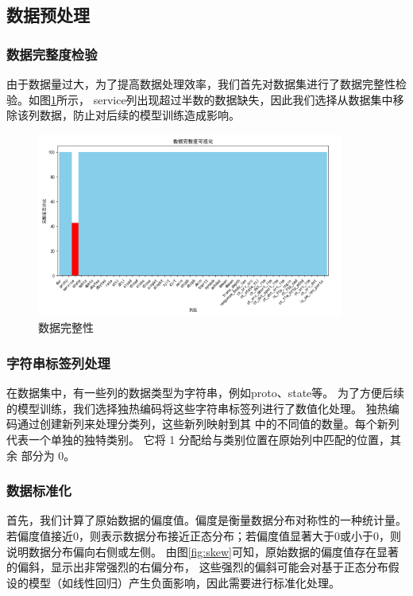 \documentclass{article}
\begin{document}
\subsection{数据预处理}

\subsubsection{数据完整度检验}
由于数据量过大，为了提高数据处理效率，我们首先对数据集进行了数据完整性检验。如图\ref{fig:full}所示，
service列出现超过半数的数据缺失，因此我们选择从数据集中移除该列数据，防止对后续的模型训练造成影响。\cite{ref6}
\begin{figure}[htpb]
  \centering
  \includegraphics[width=0.9\textwidth]{./png/full.png}
  \caption{数据完整性}
  \label{fig:full}
\end{figure}
\subsubsection{字符串标签列处理}
在数据集中，有一些列的数据类型为字符串，例如proto、state等。
为了方便后续的模型训练，我们选择独热编码将这些字符串标签列进行了数值化处理。\cite{ref5}
独热编码通过创建新列来处理分类列，这些新列映射到其
中的不同值的数量。每个新列代表一个单独的独特类别。
它将 1 分配给与类别位置在原始列中匹配的位置，其余
部分为 0。
\subsubsection{数据标准化}

首先，我们计算了原始数据的偏度值。偏度是衡量数据分布对称性的一种统计量。
若偏度值接近0，则表示数据分布接近正态分布；若偏度值显著大于0或小于0，则说明数据分布偏向右侧或左侧。
由图\ref{fig:skew}可知，原始数据的偏度值存在显著的偏斜，显示出非常强烈的右偏分布，
这些强烈的偏斜可能会对基于正态分布假设的模型（如线性回归）产生负面影响，因此需要进行标准化处理。
\end{document}
